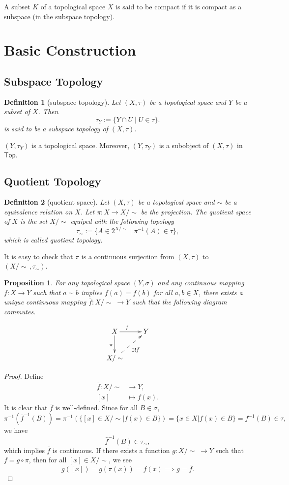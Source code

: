 \documentclass{report}
\newtheorem{definition}{Definition}[section]
\newtheorem{proposition}{Proposition}[section]
\theoremstyle{nonumberplain}
\newtheorem{proof}{Proof.}
\newcommand{\Top}{\mathsf{Top}}
\begin{document}
A subset $K$ of a topological space $X$ is said to be compact if it is compact as a subspace (in the subspace topology).
\section{Basic Construction}
\subsection{Subspace Topology}
\begin{definition}[subspace topology]
	Let $(X,\tau)$ be a topological space and $Y$ be a subset of $X$. Then
	\[
		\tau_Y:=\{Y\cap U\mid U\in \tau\}.
	\]
	is said to be a \emph{subspace topology} of $(X,\tau)$.
\end{definition}
$(Y,\tau_Y)$ is a topological space. Moreover, $(Y,\tau_Y)$ is a subobject of $(X,\tau)$ in $\Top$. 

\subsection{Quotient Topology}
\begin{definition}[quotient space]
	Let $(X,\tau)$ be a topological space and $\sim$ be a equivalence relation on $X$. Let $\pi:X\to X/\sim$ be the projection.
	The \emph{quotient space} of $X$ is the set $X/\sim$ equiped with the following topology
	\[
		\tau_\sim:=\{A\in 2^{X/\sim}\mid \pi^{-1}(A)\in \tau\},
	\]
	which is called \emph{quotient topology}.
\end{definition}

It is easy to check that $\pi$ is a continuous surjection from $(X,\tau)$ to $(X/\sim\,,\tau_\sim)$.

\begin{proposition}
	For any topological space $(Y,\sigma)$ and any continuous mapping $f:X\to Y$ such that $a\sim b$ implies $f(a) = f(b)$ for all $a,b \in X$, there exists a unique continuous mapping $\bar{f}:X/\sim\;\to Y$ such that the following diagram commutes.

	\[\xymatrix{
		X\ar[r]^{f\quad}\ar[d]_{\pi}  &Y\\
		X/\sim\ar@{-->}[ru]_{\exists!\bar{f}}&
		}\]
\end{proposition}


\begin{proof}
	Define
	\begin{align*}
		\bar{f}:X/\sim & \longrightarrow Y, \\
		[x]            & \longmapsto f(x).
	\end{align*}
	It is clear that $\bar{f}$ is well-defined. Since for all $B\in \sigma$,
	\[
		\pi^{-1}\left(\bar{f}^{-1}(B)\right)=\pi^{-1}\left(\{[x]\in X/\sim| f(x)\in B\}\right)=\{x\in X| f(x)\in B\}=f^{-1}(B)\in \tau,
	\]
	we have
	\[
		\bar{f}^{-1}(B)\in \tau_\sim,
	\]
	which implies $\bar{f}$ is continuous. If there exists a function $g:X/\sim\;\to Y$ such that $f=g\circ\pi$, then for all $[x]\in X/\sim$, we see
	\[
		g([x])=g(\pi(x))=f(x)\implies g=\bar{f}.
	\]
\end{proof}
\end{document}
